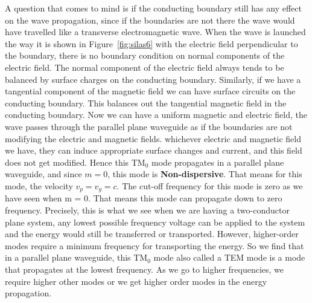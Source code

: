 A question that comes to mind is if the conducting boundary still has any effect on the wave propagation, since if the boundaries are not there the wave would have travelled like a transverse electromagnetic wave. When the wave is launched the way it is shown in Figure~\ref{fig:silas6} with the electric field perpendicular to the boundary, there is no boundary condition on normal components of the electric field. The normal component of the electric field always tends to be balanced by surface charges on the conducting boundary. Similarly, if we have a tangential component of the magnetic field we can have surface circuits on the conducting boundary. This balances out the tangential magnetic field in the conducting boundary. Now we can have a uniform magnetic and electric field, the wave passes through the parallel plane waveguide as if the boundaries are not modifying the electric and magnetic fields. whichever electric and magnetic field we have, they can induce appropriate surface changes and current, and this field does not get modified. Hence this TM$_0$ mode propagates in a parallel plane waveguide, and since $m = 0$, this mode is \textbf{Non-dispersive}. That means for this mode, the velocity $v_{p}=v_{g}=c$. The cut-off frequency for this mode is zero as we have seen when m = 0. That means this mode can propagate down to zero frequency. Precisely, this is what we see when we are having a two-conductor plane system, any lowest possible frequency voltage can be applied to the system and the energy would still be transferred or transported. However, higher-order modes require a minimum frequency for transporting the energy. So we find that in a parallel plane waveguide, this TM$_0$ mode also called a TEM mode is a mode that propagates at the lowest frequency. As we go to higher frequencies, we require higher other modes or we get higher order modes in the energy propagation.

